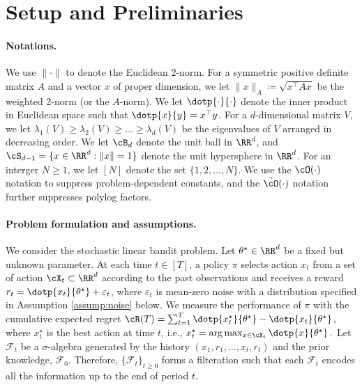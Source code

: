 \section{Setup and Preliminaries}\label{sec:setting}

\paragraph{Notations.} We use $\|\cdot\|$ to denote the Euclidean 2-norm. For a symmetric positive definite matrix $A$ and a vector $x$ of proper dimension, we let $\|x\|_{A}\coloneqq \sqrt{x^\top A x}$ be the weighted 2-norm (or the $A$-norm). We let $\dotp{\cdot}{\cdot}$ denote the inner product in Euclidean  space such that $\dotp{x}{y} = x^\top y$. For a $d$-dimensional matrix $V$,   we let $\lambda_1(V)\geq  \lambda_2(V) \geq  \dots \geq  \lambda_d(V)$ be the eigenvalues of $V$  arranged in decreasing order. 
We let $\cB_d $ denote the unit ball in $\RR^d$, and $\cS_{d-1} = \{x\in\RR^d:\|x\| =  1\}$ denote the unit hypersphere in  $\RR^d$. For an interger $N\geq 1$, we let $[N]$ denote the set $\{1,2,\dots,N\}$. We use the $\cO(\cdot	)$ notation to suppress problem-dependent constants, and the $\tilde{\cO}(\cdot)$ notation further suppresses polylog factors.

\paragraph{Problem formulation and assumptions.} We consider the stochastic linear bandit problem. Let $\theta^\star \in \RR^d$ be a fixed but unknown parameter. At each time $t\in[T]$, a policy $\pi$  selects action $x_t$ from a set of action  $\cX_t \subset \RR^d $ according to the past observations and receives a reward $r_t  = \dotp{x_t}{\theta^\star} + \varepsilon_t$, where $ \varepsilon_t$ is mean-zero noise with a distribution specified in Assumption \ref{assump:noise} below. We measure the performance of $\pi$ with the cumulative expected regret 
%
$
\cR(T) = \sum_{t= 1}^T\dotp{x^{\star}_t}{\theta^\star} -  \dotp{x_t}{\theta^\star}\,,
$
%
where $x^{\star}_t$ is the best action at time $t$, i.e., 
%
$
x^{\star}_t=\arg\max_{x \in \cX_t}\dotp{x}{\theta^\star}\,.
$
%
Let $\mathcal{F}_t$ be a $\sigma$-algebra generated by the history $(x_1, r_1, \ldots, x_t, r_t)$ and the prior knowledge, $\mathcal{F}_0$. Therefore, $\{\mathcal{F}_t\}_{t\ge 0}$ forms a filteration such that each $\mathcal{F}_t$ encodes all the information up to the end of period $t$.

